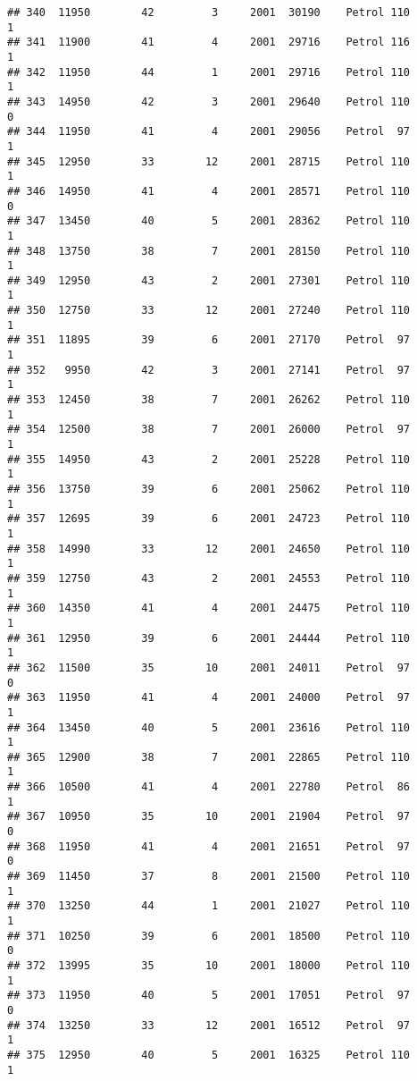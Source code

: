 \documentclass[]{article}
\begin{document}
\begin{verbatim}
## 340  11950        42         3     2001  30190    Petrol 110         1
## 341  11900        41         4     2001  29716    Petrol 116         1
## 342  11950        44         1     2001  29716    Petrol 110         1
## 343  14950        42         3     2001  29640    Petrol 110         0
## 344  11950        41         4     2001  29056    Petrol  97         1
## 345  12950        33        12     2001  28715    Petrol 110         1
## 346  14950        41         4     2001  28571    Petrol 110         0
## 347  13450        40         5     2001  28362    Petrol 110         1
## 348  13750        38         7     2001  28150    Petrol 110         1
## 349  12950        43         2     2001  27301    Petrol 110         1
## 350  12750        33        12     2001  27240    Petrol 110         1
## 351  11895        39         6     2001  27170    Petrol  97         1
## 352   9950        42         3     2001  27141    Petrol  97         1
## 353  12450        38         7     2001  26262    Petrol 110         1
## 354  12500        38         7     2001  26000    Petrol  97         1
## 355  14950        43         2     2001  25228    Petrol 110         1
## 356  13750        39         6     2001  25062    Petrol 110         1
## 357  12695        39         6     2001  24723    Petrol 110         1
## 358  14990        33        12     2001  24650    Petrol 110         1
## 359  12750        43         2     2001  24553    Petrol 110         1
## 360  14350        41         4     2001  24475    Petrol 110         1
## 361  12950        39         6     2001  24444    Petrol 110         1
## 362  11500        35        10     2001  24011    Petrol  97         0
## 363  11950        41         4     2001  24000    Petrol  97         1
## 364  13450        40         5     2001  23616    Petrol 110         1
## 365  12900        38         7     2001  22865    Petrol 110         1
## 366  10500        41         4     2001  22780    Petrol  86         1
## 367  10950        35        10     2001  21904    Petrol  97         0
## 368  11950        41         4     2001  21651    Petrol  97         0
## 369  11450        37         8     2001  21500    Petrol 110         1
## 370  13250        44         1     2001  21027    Petrol 110         1
## 371  10250        39         6     2001  18500    Petrol 110         0
## 372  13995        35        10     2001  18000    Petrol 110         1
## 373  11950        40         5     2001  17051    Petrol  97         0
## 374  13250        33        12     2001  16512    Petrol  97         1
## 375  12950        40         5     2001  16325    Petrol 110         1

\end{verbatim}
\end{document}
